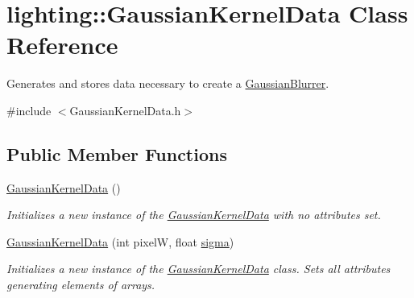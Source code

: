 \hypertarget{classlighting_1_1GaussianKernelData}{}\section{lighting\+:\+:Gaussian\+Kernel\+Data Class Reference}
\label{classlighting_1_1GaussianKernelData}


Generates and stores data necessary to create a \hyperlink{classlighting_1_1GaussianBlurrer}{Gaussian\+Blurrer}.  




{\ttfamily \#include $<$Gaussian\+Kernel\+Data.\+h$>$}

\subsection*{Public Member Functions}
\begin{DoxyCompactItemize}
\item 
\hyperlink{classlighting_1_1GaussianKernelData_a416a13d87e6afe5b104e543251363a37}{Gaussian\+Kernel\+Data} ()
\begin{DoxyCompactList}\small\item\em Initializes a new instance of the \hyperlink{classlighting_1_1GaussianKernelData}{Gaussian\+Kernel\+Data} with no attributes set. \end{DoxyCompactList}\item 
\hyperlink{classlighting_1_1GaussianKernelData_a5a395d3d828de3a98d1a0d47404bc818}{Gaussian\+Kernel\+Data} (int pixelW, float \hyperlink{classlighting_1_1GaussianKernelData_ac99c7370fa30896baef2f03c91dd6885}{sigma})
\begin{DoxyCompactList}\small\item\em Initializes a new instance of the \hyperlink{classlighting_1_1GaussianKernelData}{Gaussian\+Kernel\+Data} class. Sets all attributes generating elements of arrays. \end{DoxyCompactList}\end{DoxyCompactItemize}
